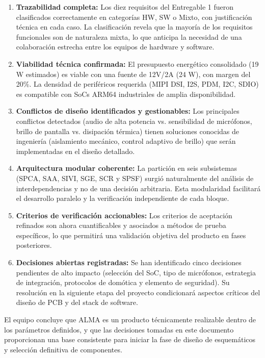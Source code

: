 \documentclass[%
	paper=a4,
	twoside=false,
	parskip=half,
	chapterprefix=false,
	10pt,
	headings=normal,
	bibliography=totoc,
	listof=totoc,
	titlepage=on,
	captions=tableabove,
	draft=false,
]{scrbook}%
\begin{document}
\begin{enumerate}
    \item \textbf{Trazabilidad completa:} Los diez requisitos del Entregable 1 fueron clasificados correctamente en categorías HW, SW o Mixto, con justificación técnica en cada caso. La clasificación revela que la mayoría de los requisitos funcionales son de naturaleza mixta, lo que anticipa la necesidad de una colaboración estrecha entre los equipos de hardware y software.

    \item \textbf{Viabilidad técnica confirmada:} El presupuesto energético consolidado (19 W estimados) es viable con una fuente de 12V/2A (24 W), con margen del 20\%. La densidad de periféricos requerida (MIPI DSI, I2S, PDM, I2C, SDIO) es compatible con SoCs ARM64 industriales de amplia disponibilidad.

    \item \textbf{Conflictos de diseño identificados y gestionables:} Los principales conflictos detectados (audio de alta potencia vs. sensibilidad de micrófonos, brillo de pantalla vs. disipación térmica) tienen soluciones conocidas de ingeniería (aislamiento mecánico, control adaptivo de brillo) que serán implementadas en el diseño detallado.

    \item \textbf{Arquitectura modular coherente:} La partición en seis subsistemas (SPCA, SAA, SIVI, SGE, SCR y SPSF) surgió naturalmente del análisis de interdependencias y no de una decisión arbitraria. Esta modularidad facilitará el desarrollo paralelo y la verificación independiente de cada bloque.

    \item \textbf{Criterios de verificación accionables:} Los criterios de aceptación refinados son ahora cuantificables y asociados a métodos de prueba específicos, lo que permitirá una validación objetiva del producto en fases posteriores.

    \item \textbf{Decisiones abiertas registradas:} Se han identificado cinco decisiones pendientes de alto impacto (selección del SoC, tipo de micrófonos, estrategia de integración, protocolos de domótica y elemento de seguridad). Su resolución en la siguiente etapa del proyecto condicionará aspectos críticos del diseño de PCB y del stack de software.
\end{enumerate}

El equipo concluye que ALMA es un producto técnicamente realizable dentro de los parámetros definidos, y que las decisiones tomadas en este documento proporcionan una base consistente para iniciar la fase de diseño de esquemáticos y selección definitiva de componentes.
\end{document}

